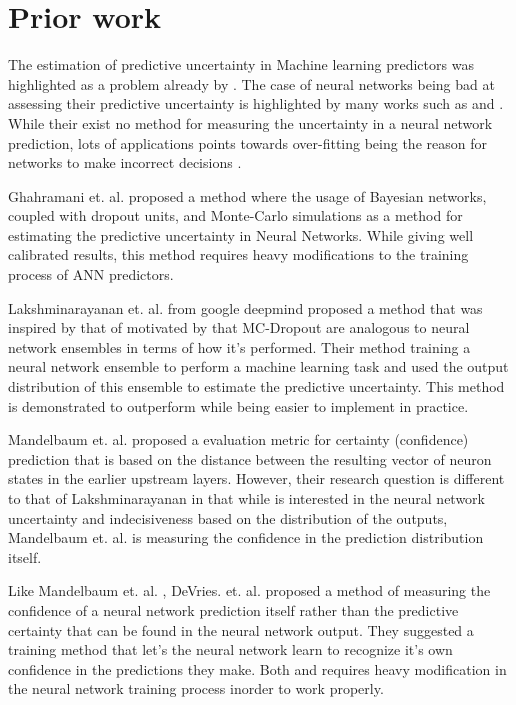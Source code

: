 \section{Prior work}

The estimation of predictive uncertainty in Machine learning predictors was highlighted as a problem already by \cite{quinonero2006evaluating}. The case of neural networks being bad at assessing their predictive uncertainty is highlighted by many works such as \cite{lakshminarayanan2017simple,lowd2005adversarial} and \cite{nguyen2015deep}. While their exist no method for measuring the uncertainty in a neural network prediction, lots of applications points towards over-fitting being the reason for networks to make incorrect decisions \cite{goodfellow2014generative}.

Ghahramani et. al.\cite{gal2016dropout} proposed a method where the usage of Bayesian networks, coupled with dropout units, and Monte-Carlo simulations as a method for estimating the predictive uncertainty in Neural Networks. While giving well calibrated results, this method requires heavy modifications to the training process of ANN predictors\cite{lakshminarayanan2017simple}.

Lakshminarayanan et. al. \cite{lakshminarayanan2017simple} from google deepmind proposed a method that was inspired by that of \cite{gal2016dropout} motivated by that MC-Dropout are analogous to neural network ensembles in terms of how it's performed. Their method training a neural network ensemble to perform a machine learning task and used the output distribution of this ensemble to estimate the predictive uncertainty. This method is demonstrated to outperform \cite{gal2016dropout} while being easier to implement in practice.

Mandelbaum et. al. \cite{mandelbaum2017distance} proposed a evaluation metric for certainty (confidence) prediction that is based on the distance between the resulting vector of neuron states in the earlier upstream layers. However, their research question is different to that of Lakshminarayanan \cite{lakshminarayanan2017simple} in that while \cite{lakshminarayanan2017simple} is interested in the neural network uncertainty and indecisiveness based on the distribution of the outputs, Mandelbaum et. al.\cite{mandelbaum2017distance} is measuring the confidence in the prediction distribution itself. 

Like Mandelbaum et. al. \cite{mandelbaum2017distance}, DeVries. et. al. \cite{devries2018learning} proposed a method of measuring the confidence of a neural network prediction itself rather than the predictive certainty that can be found in the neural network output. They suggested a training method that let's the neural network learn to recognize it's own confidence in the predictions they make. Both \cite{mandelbaum2017distance} and \cite{devries2018learning} requires heavy modification in the neural network training process inorder to work properly.